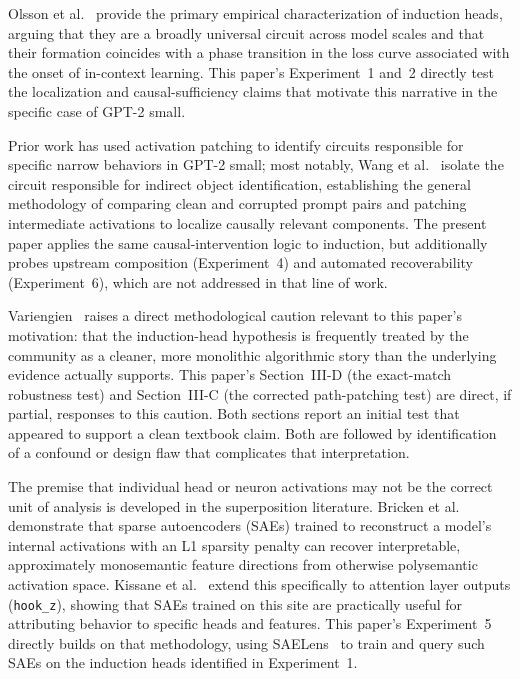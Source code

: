 \documentclass[conference]{IEEEtran}
\begin{document}
Olsson et al.~\cite{olsson2022} provide the primary empirical characterization of induction heads, arguing that they are a broadly universal circuit across model scales and that their formation coincides with a phase transition in the loss curve associated with the onset of in-context learning. This paper's Experiment~1 and~2 directly test the localization and causal-sufficiency claims that motivate this narrative in the specific case of GPT-2 small.

Prior work has used activation patching to identify circuits responsible for specific narrow behaviors in GPT-2 small; most notably, Wang et al.~\cite{wang2022} isolate the circuit responsible for indirect object identification, establishing the general methodology of comparing clean and corrupted prompt pairs and patching intermediate activations to localize causally relevant components. The present paper applies the same causal-intervention logic to induction, but additionally probes upstream composition (Experiment~4) and automated recoverability (Experiment~6), which are not addressed in that line of work.

Variengien~\cite{variengien2023} raises a direct methodological caution relevant to this paper's motivation: that the induction-head hypothesis is frequently treated by the community as a cleaner, more monolithic algorithmic story than the underlying evidence actually supports. This paper's Section~III-D (the exact-match robustness test) and Section~III-C (the corrected path-patching test) are direct, if partial, responses to this caution. Both sections report an initial test that appeared to support a clean textbook claim. Both are followed by identification of a confound or design flaw that complicates that interpretation.

The premise that individual head or neuron activations may not be the correct unit of analysis is developed in the superposition literature. Bricken et al.~\cite{bricken2023} demonstrate that sparse autoencoders (SAEs) trained to reconstruct a model's internal activations with an L1 sparsity penalty can recover interpretable, approximately monosemantic feature directions from otherwise polysemantic activation space. Kissane et al.~\cite{kissane2024} extend this specifically to attention layer outputs (\texttt{hook\_z}), showing that SAEs trained on this site are practically useful for attributing behavior to specific heads and features. This paper's Experiment~5 directly builds on that methodology, using SAELens~\cite{bloom2024} to train and query such SAEs on the induction heads identified in Experiment~1.
\end{document}
